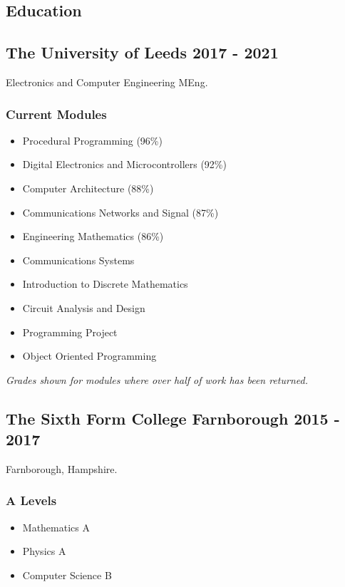 \documentclass[margin]{res}
\begin{document}
\address{Glynver, Pines Road, Fleet, Hampshire, GU51 4NL\\
07864 256040\\
(01252) 616190\\
angus.findlay@icloud.com\\
el17ajf@leeds.ac.uk\\
linkedin.com/in/angus-findlay
}

\begin{resume}

\section{Education}
\subsection{The University of Leeds \hfill 2017 - 2021}
Electronics and Computer Engineering MEng.
\subsubsection{Current Modules}
\begin{itemize}
\item Procedural Programming (96\%)
\item Digital Electronics and Microcontrollers (92\%)
\item Computer Architecture (88\%)
\item Communications Networks and Signal (87\%)
\item Engineering Mathematics (86\%)
\item Communications Systems
\item Introduction to Discrete Mathematics
\item Circuit Analysis and Design
\item Programming Project
\item Object Oriented Programming
\end{itemize}
{\sl Grades shown for modules where over half of work has been returned.}
\subsection{The Sixth Form College Farnborough \hfill 2015 - 2017}
Farnborough, Hampshire.
\subsubsection{A Levels}
\begin{itemize}
\item Mathematics A
\item Physics A
\item Computer Science B
\end{itemize}


\end{resume}
\end{document}

